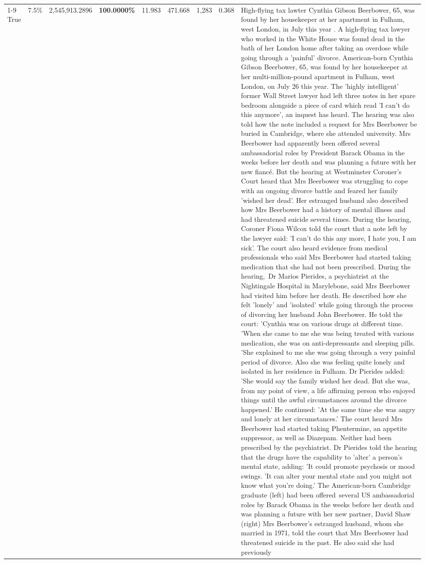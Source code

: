 \begin{table}[H]
\begin{tabular}{lllrlllll}
\cline{1-9}
True & 7.5\% & 2,545,913.2896 & \bfseries \color{red} 100.0000\% & 11.983 & 471.668 & 1,283 & 0.368 & High-flying tax lawter Cynthia Gibson Beerbower, 65, was found by her housekeeper at her apartment in Fulham, west London, in July this year . A high-flying tax lawyer who worked in the White House was found dead in the bath of her London home after taking an overdose while going through a 'painful' divorce. American-born Cynthia Gibson Beerbower, 65, was found by her housekeeper at her multi-million-pound apartment in Fulham, west London, on July 26 this year. The 'highly intelligent' former Wall Street lawyer had left three notes in her spare bedroom alongside a piece of card which read 'I can't do this anymore', an inquest has heard. The hearing was also told how the note included a request for Mrs Beerbower be buried in Cambridge, where she attended university. Mrs Beerbower had apparently been offered several ambassadorial roles by President Barack Obama in the weeks before her death and was planning a future with her new fiancé. But the hearing at Westminster Coroner's Court heard that Mrs Beerbower was struggling to cope with an ongoing divorce battle and feared her family 'wished her dead'. Her estranged husband also described how Mrs Beerbower had a history of mental illness and had threatened suicide several times. During the hearing, Coroner Fiona Wilcox told the court that a note left by the lawyer said: 'I can't do this any more, I hate you, I am sick'. The court also heard evidence from medical professionals who said Mrs Beerbower had started taking medication that she had not been prescribed. During the hearing, Dr Marios Pierides, a psychiatrist at the Nightingale Hospital in Marylebone, said Mrs Beerbower had visited him before her death. He described how she felt 'lonely' and 'isolated' while going through the process of divorcing her husband John Beerbower. He told the court: 'Cynthia was on various drugs at different time. 'When she came to me she was being treated with various medication, she was on anti-depressants and sleeping pills. 'She explained to me she was going through a very painful period of divorce. Also she was feeling quite lonely and isolated in her residence in Fulham. Dr Pierides added: 'She would say the family wished her dead. But she was, from my point of view, a life affirming person who enjoyed things until the awful circumstances around the divorce happened.' He continued: 'At the same time she was angry and lonely at her circumstances.' The court heard Mrs Beerbower had started taking Phentermine, an appetite suppressor, as well as Diazepam. Neither had been prescribed by the psychiatrist. Dr Pierides told the hearing that the drugs have the capability to 'alter' a person's mental state, adding: 'It could promote psychosis or mood swings. 'It can alter your mental state and you might not know what you're doing.' The American-born Cambridge graduate (left) had been offered several US ambassadorial roles by Barack Obama in the weeks before her death and was planning a future with her new partner, David Shaw (right) Mrs Beerbower's estranged husband, whom she married in 1971, told the court that Mrs Beerbower had threatened suicide in the past. He also said she had previously 
\end{tabular}
\end{table}
